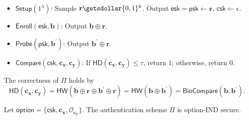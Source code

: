 \begin{itemize}

	\item $\mathsf{Setup} (1^\lambda)$: Sample $\mathbf{r} \getsdollar \{0, 1\}^k$. Output $\mathsf{esk} = \mathsf{psk} \gets \mathbf{r}$, $\mathsf{csk} \gets \epsilon$.

	\item $\mathsf{Enroll}(\mathsf{esk}, \mathbf{b})$: Output $\mathbf{b} \oplus \mathbf{r}$.
	
	\item $\mathsf{Probe}(\mathsf{psk}, \mathbf{b}^\prime)$: Output $\mathbf{b}^\prime \oplus \mathbf{r}$.

	\item $\mathsf{Compare} (\mathsf{csk}, \mathbf{c_x}, \mathbf{c_y})$: If $\mathsf{HD}(\mathbf{c_x}, \mathbf{c_y}) \leq \tau$, return $1$; otherwise, return $0$. 

\end{itemize}
The correctness of $\Pi$ holds by
\[
	\textsf{HD}(\mathbf{c_x}, \mathbf{c_y}) = \textsf{HW}(\mathbf{b} \oplus \mathbf{r} \oplus \mathbf{b}^\prime \oplus \mathbf{r}) = \textsf{HW}(\mathbf{b} \oplus \mathbf{b}^\prime) = \textsf{BioCompare}(\mathbf{b}, \mathbf{b}^\prime).
\]

\begin{theorem}
\label{thm:rh:ind:particular-biometri-layer}
Let $\mathsf{option} = \{\mathsf{csk}, \mathbf{c_x}, \mathcal{O}_{\mathbf{c_y}}\}$. The authentication scheme $\Pi$ is \textsf{option}-IND secure.

\end{theorem}

